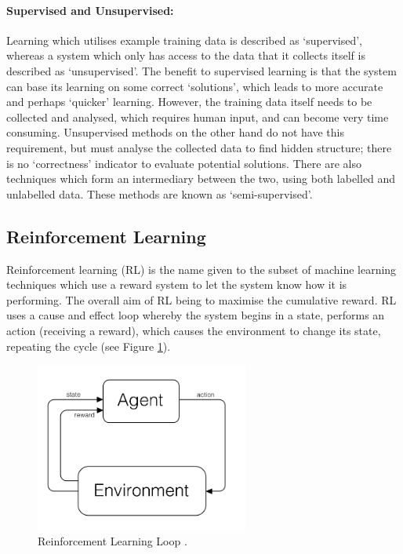 \documentclass[a4paper,oneside]{report}
\begin{document}
\paragraph{Supervised and Unsupervised:} Learning which utilises example training data is described as `supervised', whereas a system which only has access to the data that it collects itself is described as `unsupervised'. The benefit to supervised learning is that the system can base its learning on some correct `solutions', which leads to more accurate and perhaps `quicker' learning. However, the training data itself needs to be collected and analysed, which requires human input, and can become very time consuming. Unsupervised methods on the other hand do not have this requirement, but must analyse the collected data to find hidden structure; there is no `correctness' indicator to evaluate potential solutions. There are also techniques which form an intermediary between the two, using both labelled and unlabelled data. These methods are known as `semi-supervised'.

\subsection{Reinforcement Learning}

Reinforcement learning (RL) is the name given to the subset of machine learning techniques which use a reward system to let the system know how it is performing. The overall aim of RL being to maximise the cumulative reward. RL uses a cause and effect loop whereby the system begins in a state, performs an action (receiving a reward), which causes the environment to change its state, repeating the cycle (see Figure \ref{fig:Screen}).

\begin{figure}
  \centering
    \includegraphics[width=70mm]{sources/images/RLDiagram}
    \caption{Reinforcement Learning Loop \cite{Nilsson:2010qa}.}
    \label{fig:Screen}
\end{figure}
\end{document}
